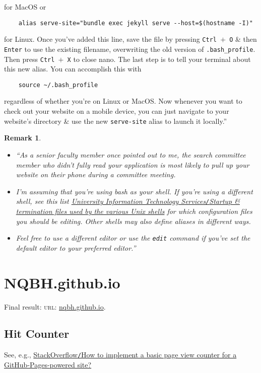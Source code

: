 \documentclass{article}
\numberwithin{equation}{section}
\newtheorem{remark}{Remark}[section]
\begin{document}
for MacOS or
\begin{verbatim}
	alias serve-site="bundle exec jekyll serve --host=$(hostname -I)"
\end{verbatim}
for Linux. Once you've added this line, save the file by pressing \texttt{Ctrl $+$ O} \& then \texttt{Enter} to use the existing filename, overwriting the old version of \verb|.bash_profile|. Then press \texttt{Ctrl $+$ X} to close nano. The last step is to tell your terminal about this new alias. You can accomplish this with
\begin{verbatim}
	source ~/.bash_profile
\end{verbatim}
regardless of whether you're on Linux or MacOS. Now whenever you want to check out your website on a mobile device, you can just navigate to your website's directory \& use the new \verb|serve-site| alias to launch it locally.''

\begin{remark}
	\begin{itemize}
		\item ``As a senior faculty member once pointed out to me, the search committee member who didn't fully read your application is most likely to pull up your website on their phone during a committee meeting.
		\item I'm assuming that you're using bash as your shell. If you're using a different shell, see this list \href{https://kb.iu.edu/d/abdy}{University Information Technology Services\texttt{/}Startup \& termination files used by the various Unix shells} for which configuration files you should be editing. Other shells may also define aliases in different ways.
		\item Feel free to use a different editor or use the \texttt{edit} command if you've set the default editor to your preferred editor.''
	\end{itemize}
\end{remark}

\section{NQBH.github.io}
Final result: \textsc{url}: \url{nqbh.github.io}.

\subsection{Hit Counter}
See, e.g., \href{https://stackoverflow.com/questions/57747640/how-to-implement-a-basic-page-view-counter-for-a-github-pages-powered-site}{StackOverflow\texttt{/}How to implement a basic page view counter for a GitHub-Pages-powered site?}
\end{document}
